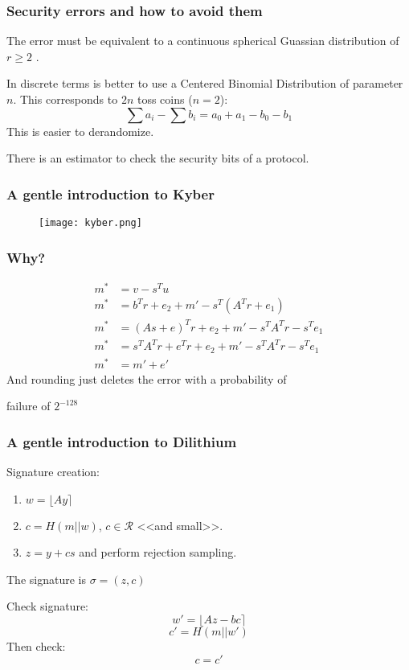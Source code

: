 \documentclass[presentation]{beamer}
\begin{document}
\begin{frame}[label=security-errors-and-how-to-avoid-them]
  \frametitle{Security errors and how to avoid them}
  The error must be equivalent to a continuous spherical Guassian
  distribution of $r \geq 2$ \cite{how-not-to-instantiate}.

  In discrete terms is better to use a Centered Binomial
  Distribution of parameter $n$. This corresponds to $2n$ 
  toss coins ($n = 2$):
  \[
    \sum a_i - \sum b_i = a_0 + a_1 - b_0 - b_1
  \]
  This is easier to derandomize.
  \pause

  There is an estimator \cite{laticce-estimator} to check the
  security bits of a protocol.
\end{frame}
\begin{frame}[label=a-gentle-introduction-to-kyber]
  \frametitle{A gentle introduction to Kyber}
  \begin{figure}
    \centering
    \texttt{[image: kyber.png]}
  \end{figure}
\end{frame}
\begin{frame}
  \frametitle{Why?}
  \begin{equation}
    \begin{array}{rl}
      m^* &= v - s^T u \\
      m^* &= b^T r + e_2 + m' - s^T(A^T r + e_1) \\
      m^* &= (As+e)^Tr + e_2 + m' - s^TA^Tr - s^Te_1 \\
      m^* &= s^TA^Tr + e^Tr + e_2 + m'  - s^TA^Tr - s^Te_1 \\
      m^* &= m' + e'
    \end{array}
  \end{equation}
  And rounding just deletes the error with a probability of

  failure of $2^{-128}$
\end{frame}
\begin{frame}[label=a-gentle-introduction-to-dilithium]
  \frametitle{A gentle introduction to Dilithium}
  Signature creation:
  \begin{enumerate} 
    \item $w = \lfloor Ay \rceil$
    \item $c = H(m || w)$, $c \in \mathcal R$ <<and small>>.
    \item $z = y + cs$ and perform rejection sampling.
  \end{enumerate}
  The signature is $\sigma = (z, c)$
  \pause

  Check signature:
  \[w' = \lfloor Az - bc \rceil \]
  \[c' = H(m || w') \]
  Then check:
  \[c = c'\]
\end{frame}
\end{document}
